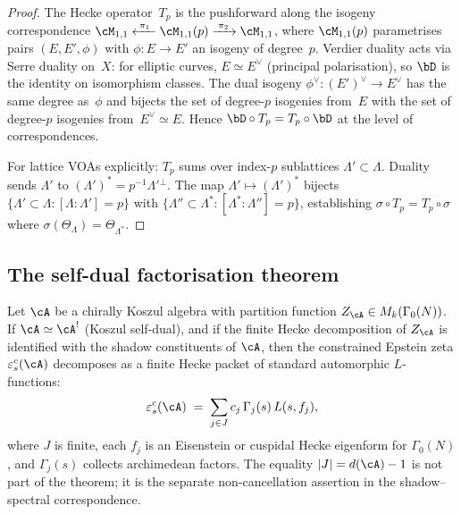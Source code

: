 \begin{proof}
The Hecke operator~$T_p$ is the pushforward along the isogeny
correspondence
$\cM_{1,1} \xleftarrow{\;\pi_1\;}
\cM_{1,1}(p) \xrightarrow{\;\pi_2\;} \cM_{1,1}$,
where $\cM_{1,1}(p)$ parametrises pairs $(E,E',\phi)$ with
$\phi\colon E\to E'$ an isogeny of degree~$p$.
Verdier duality acts via Serre duality on~$X$: for elliptic
curves, $E\simeq E^\vee$ (principal polarisation), so $\bD$
is the identity on isomorphism classes. The dual isogeny
$\phi^\vee\colon (E')^\vee \to E^\vee$ has the same degree as~$\phi$
and bijects the set of degree-$p$ isogenies from~$E$ with
the set of degree-$p$ isogenies from~$E^\vee \simeq E$.
Hence $\bD\circ T_p = T_p\circ\bD$ at the level of
correspondences.

For lattice VOAs explicitly: $T_p$ sums over index-$p$
sublattices $\Lambda' \subset \Lambda$. Duality sends
$\Lambda'$ to $(\Lambda')^* = p^{-1}\Lambda'{}^\perp$.
The map $\Lambda' \mapsto (\Lambda')^*$ bijects
$\{\Lambda'\subset\Lambda : [\Lambda:\Lambda']=p\}$ with
$\{\Lambda''\subset\Lambda^* : [\Lambda^*:\Lambda'']=p\}$,
establishing $\sigma\circ T_p = T_p\circ\sigma$ where
$\sigma(\Theta_\Lambda) = \Theta_{\Lambda^*}$.
\end{proof}

\subsection{The self-dual factorisation theorem}

\begin{theorem}%
\label{thm:self-dual-factorization}%
\ClaimStatusProvedHere%
%
%
Let $\cA$ be a chirally Koszul algebra with partition function
$Z_\cA \in M_k(\Gamma_0(N))$. If $\cA\simeq\cA^!$
\textup{(}Koszul self-dual\textup{)}, and if the finite
Hecke decomposition of $Z_\cA$ is identified with the shadow
constituents of $\cA$, then the constrained
Epstein zeta $\varepsilon^c_s(\cA)$ decomposes as a finite Hecke
packet of standard automorphic $L$-functions:
\begin{equation}\label{eq:self-dual-factorization}
 \varepsilon^c_s(\cA)
 \;=\;
 \sum_{j\in J} c_j\,\Gamma_j(s)\,L(s, f_j),
\end{equation}
where $J$ is finite, each $f_j$ is an Eisenstein or cuspidal Hecke
eigenform for $\Gamma_0(N)$, and $\Gamma_j(s)$ collects archimedean
factors. The equality $|J|=d(\cA)-1$ is not part of the theorem; it is
the separate non-cancellation assertion in the shadow--spectral
correspondence.
\end{theorem}

